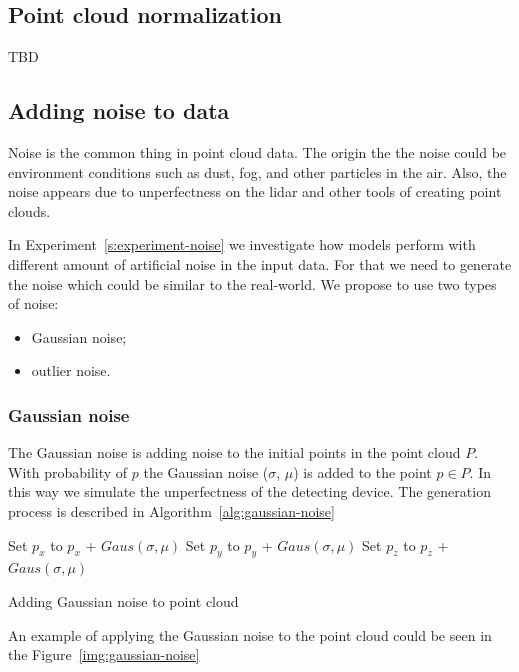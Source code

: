 \subsection{Point cloud normalization}
TBD



\subsection{Adding noise to data}
Noise is the common thing in point cloud data. The origin the the noise could be environment conditions such as dust, fog, and other particles in the air. Also, the noise appears due to unperfectness on the lidar and other tools of creating point clouds.

In Experiment~\ref{s:experiment-noise} we investigate how models perform with different amount of artificial noise in the input data. For that we need to generate the noise which could be similar to the real-world. We propose to use two types of noise:
\begin{itemize}
  \item Gaussian noise;
  \item outlier noise.
\end{itemize}

\subsubsection{Gaussian noise}
The Gaussian noise is adding noise to the initial points in the point cloud $P$. With probability of $p$ the Gaussian noise ($\sigma$, $\mu$) is added to the point $p \in P$. In this way we simulate the unperfectness of the detecting device. The generation process is described in Algorithm~\ref{alg:gaussian-noise}

\begin{algorithm}[H]
\label{alg:gaussian-noise}
\SetAlgoLined
{}
 {
     {
        Set $p_x$ to $p_x$ + $Gaus(\sigma, \mu)$ \;
        Set $p_y$ to $p_y$ + $Gaus(\sigma, \mu)$ \;
        Set $p_z$ to $p_z$ + $Gaus(\sigma, \mu)$ \;
    }
}
\caption{Adding Gaussian noise to point cloud \parencite{uchida_tom-uchidaadd_noise_to_point_cloud_2021}}
\end{algorithm}

An example of applying the Gaussian noise to the point cloud could be seen in the Figure~\ref{img:gaussian-noise}

